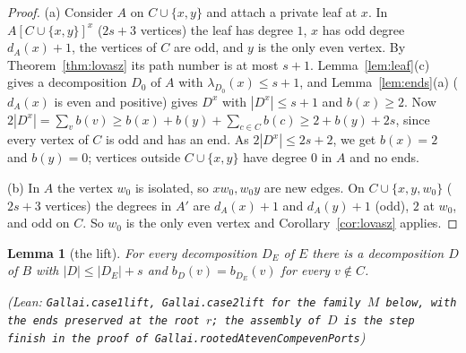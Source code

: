 \documentclass[11pt]{amsart}
\newtheorem{lemma}[theorem]{Lemma}
\theoremstyle{definition}
\theoremstyle{remark}
\renewcommand{\_}{\oldunderscore\allowbreak}
\newcommand{\leanst}[1]{\par{\raggedright\small\textup{(Lean: \texttt{#1})}\par}}
\begin{document}
\begin{proof}
(a) Consider $A$ on $C\cup\{x,y\}$ and attach a private leaf at $x$. In $A[C\cup\{x,y\}]^x$
($2s+3$ vertices) the leaf has degree $1$, $x$ has odd degree $d_A(x)+1$, the vertices of $C$ are
odd, and $y$ is the only even vertex. By Theorem~\ref{thm:lovasz} its path number is at most $s+1$.
Lemma~\ref{lem:leaf}(c) gives a decomposition $D_0$ of $A$ with $\lambda_{D_0}(x)\le s+1$, and
Lemma~\ref{lem:ends}(a) ($d_A(x)$ is even and positive) gives $D^x$ with $|D^x|\le s+1$ and
$b(x)\ge2$. Now $2|D^x|=\sum_v b(v)\ge b(x)+b(y)+\sum_{c\in C}b(c)\ge 2+b(y)+2s$, since every
vertex of $C$ is odd and has an end. As $2|D^x|\le2s+2$, we get $b(x)=2$ and $b(y)=0$; vertices
outside $C\cup\{x,y\}$ have degree $0$ in $A$ and no ends.

(b) In $A$ the vertex $w_0$ is isolated, so $xw_0,w_0y$ are new edges. On $C\cup\{x,y,w_0\}$
($2s+3$ vertices) the degrees in $A'$ are $d_A(x)+1$ and $d_A(y)+1$ (odd), $2$ at $w_0$, and odd on
$C$. So $w_0$ is the only even vertex and Corollary~\ref{cor:lovasz} applies.
\end{proof}

\begin{lemma}[the lift]\label{lem:lift-ee}
For every decomposition $D_E$ of $E$ there is a decomposition $D$ of $B$ with $|D|\le|D_E|+s$ and
$b_D(v)=b_{D_E}(v)$ for every $v\notin C$.
\leanst{Gallai.case1\_lift, Gallai.case2\_lift for the family $M$ below, with the ends preserved at
the root $r$; the assembly of $D$ is the step \texttt{finish} in the proof of
Gallai.rootedAt\_evenComp\_evenPorts}
\end{lemma}
\end{document}
